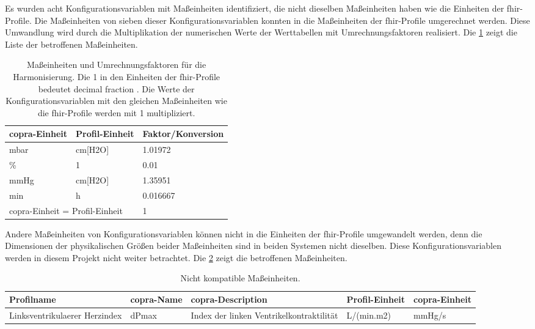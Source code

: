 Es wurden acht Konfigurationsvariablen mit Maßeinheiten identifiziert, die nicht dieselben Maßeinheiten haben wie die Einheiten der \ac{fhir}-Profile. Die Maßeinheiten von sieben dieser Konfigurationsvariablen konnten in die Maßeinheiten der \ac{fhir}-Profile umgerechnet werden. Diese Umwandlung wird durch die Multiplikation der numerischen Werte der Werttabellen mit Umrechnungsfaktoren realisiert. Die \ref{tab:unittoconvert} zeigt die Liste der betroffenen Maßeinheiten.  

\clearpage

\begin{table}[ht]
	\centering
	\caption[Maßeinheiten und Umrechnungsfaktoren für die Harmonisierung]{Maßeinheiten und Umrechnungsfaktoren für die Harmonisierung. Die 1 in den Einheiten der \ac{fhir}-Profile bedeutet \glqq decimal fraction\grqq{} \cite{unitsloinc}. Die Werte der Konfigurationsvariablen mit den gleichen Maßeinheiten wie die \ac{fhir}-Profile werden mit 1 multipliziert.}
	\label{tab:unittoconvert}
	\begin{tabular}{|l|l|l|} \hline
		\bfseries \ac{copra}-Einheit & \bfseries Profil-Einheit & \bfseries Faktor/Konversion \\ \hline
		mbar & cm[H2O] & 1.01972 \\ \hline
		\% & 1 & 0.01 \\ \hline
		mmHg & cm[H2O] & 1.35951 \\ \hline
		min & h & 0.016667 \\ \hline
		\multicolumn{2}{|l|}{\ac{copra}-Einheit = Profil-Einheit} & 1 \\ \hline
	\end{tabular}
\end{table}

Andere Maßeinheiten von Konfigurationsvariablen können nicht in die Einheiten der \ac{fhir}-Profile umgewandelt werden, denn die Dimensionen der physikalischen Größen beider Maßeinheiten sind in beiden Systemen nicht dieselben. Diese Konfigurationsvariablen werden in diesem Projekt nicht weiter betrachtet. Die \ref{tab:unitnocompat} zeigt die betroffenen Maßeinheiten. 

\begin{table}[ht]
	\centering
	\caption[Nicht kompatible Maßeinheiten]{Nicht kompatible Maßeinheiten.}
	\label{tab:unitnocompat}
	\begin{tabular}{|p{3.3cm}|p{1.7cm}|p{2.6cm}|p{2cm}|p{1.8cm}|} \hline
		\bfseries Profilname & \bfseries \ac{copra}-Name & \bfseries \ac{copra}-Description & \bfseries Profil-Einheit & \bfseries \ac{copra}-Einheit \\ \hline
		Linksventrikulaerer Herzindex & dPmax & Index der linken Ventrikelkontraktilität & L/(min.m2) & mmHg/s \\ \hline
	\end{tabular}
\end{table}

